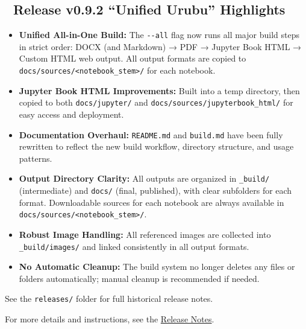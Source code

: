 \subsection{🚀 Release v0.9.2 ``Unified Urubu''
Highlights}\label{release-v0.9.2-unified-urubu-highlights}

\begin{itemize}
\tightlist
\item
  \textbf{Unified All-in-One Build:} The \texttt{-\/-all} flag now runs
  all major build steps in strict order: DOCX (and Markdown) → PDF →
  Jupyter Book HTML → Custom HTML web output. All output formats are
  copied to
  \texttt{docs/sources/\textless{}notebook\_stem\textgreater{}/} for
  each notebook.
\item
  \textbf{Jupyter Book HTML Improvements:} Built into a temp directory,
  then copied to both \texttt{docs/jupyter/} and
  \texttt{docs/sources/jupyterbook\_html/} for easy access and
  deployment.
\item
  \textbf{Documentation Overhaul:} \texttt{README.md} and
  \texttt{build.md} have been fully rewritten to reflect the new build
  workflow, directory structure, and usage patterns.
\item
  \textbf{Output Directory Clarity:} All outputs are organized in
  \texttt{\_build/} (intermediate) and \texttt{docs/} (final,
  published), with clear subfolders for each format. Downloadable
  sources for each notebook are always available in
  \texttt{docs/sources/\textless{}notebook\_stem\textgreater{}/}.
\item
  \textbf{Robust Image Handling:} All referenced images are collected
  into \texttt{\_build/images/} and linked consistently in all output
  formats.
\item
  \textbf{No Automatic Cleanup:} The build system no longer deletes any
  files or folders automatically; manual cleanup is recommended if
  needed.
\end{itemize}

See the \texttt{releases/} folder for full historical release notes.

For more details and instructions, see the
\href{https://github.com/dannycab/modern-classical-mechanics/releases}{Release
Notes}.
